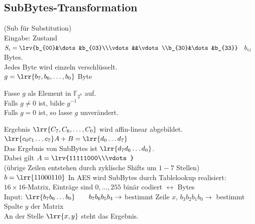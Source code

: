 	\subsection{SubBytes-Transformation}
		(Sub für Substitution)\\
		Eingabe: Zustand $S_i=\lrv{b_{00}&\dots&b_{03}\\\vdots&&\vdots\\b_{30}&\dots&b_{33}}\quad b_{ij}$ Bytes.\\
		Jedes Byte wird einzeln verschlüsselt.\\
		$g=\lrr{b_7,b_6,\dots,b_0}$ Byte
			\item Fasse $g$ als Element in $\mathbb{F}_{2^8}$ auf.\\
				Falls $g\neq 0$ ist, bilde $g^{-1}$\\
				Falls $g=0$ ist, so lasse $g$ unverändert.
			\item Ergebnis $\lrr{C_7,C_6,\dots,C_0}$ wird affin-linear abgebildet.\\
				$\lrr{c_0c_1\dots c_7} A+B=\lrr{d_0\dots d_7}$\\
				Das Ergebnis von SubBytes ist $\lrr{d_7d_6\dots d_0}$.\\
				Dabei gilt $A=\lrv{11111000\\\vdots}$\\
				(übrige Zeilen entstehen durch zyklische Shifts um $1-7$ Stellen)\\
				$b=\lrr{11000110}$
		\subExEnd
		In AES wird SubBytes durch Tablelookup realisiert:\\
		$16\times 16$-Matrix, Einträge sind $0,\dots,255$ binär codiert $\leftrightarrow$ Bytes\\
		Input: $\lrr{b_7b_6\dots b_0}\qquad b_7b_6b_5b_4\rightarrow$ bestimmt Zeile $x$, $b_3b_2b_1b_0\rightarrow$ bestimmt Spalte $y$ der Matrix\\
		An der Stelle $\lrr{x,y}$ steht das Ergebnis.
